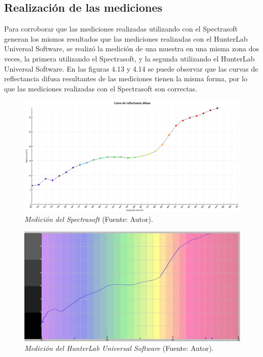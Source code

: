 	\subsection{Realizaci\'{o}n de las mediciones}
		Para corroborar que las mediciones realizadas utilizando con el Spectrasoft generan los mismos resultados que las mediciones realizadas con el HunterLab Universal Software, se realiz\'{o} la medici\'{o}n de una muestra en una misma zona dos veces, la primera utilizando el Spectrasoft, y la segunda utilizando el HunterLab Universal Software. En las figuras 4.13 y 4.14 se puede observar que las curvas de reflectancia difusa resultantes de las mediciones tienen la misma forma, por lo que las mediciones realizadas con el Spectrasoft son correctas.
	\newpage
 	\begin{figure}[H]
		\centering
		\includegraphics[scale=0.4]{img/medicion-spectrasoft.jpg}
			\caption[Medici\'{o}n del Spectrasoft]{\textit{Medici\'{o}n del Spectrasoft} (Fuente: Autor).}
	\end{figure}
	
 	\begin{figure}[H]
		\centering
		\includegraphics[scale=0.45]{img/medicion-hunterlab.jpg}
			\caption[Medici\'{o}n del HunterLab Universal Software]{\textit{Medici\'{o}n del HunterLab Universal Software} (Fuente: Autor).}
	\end{figure}
	
